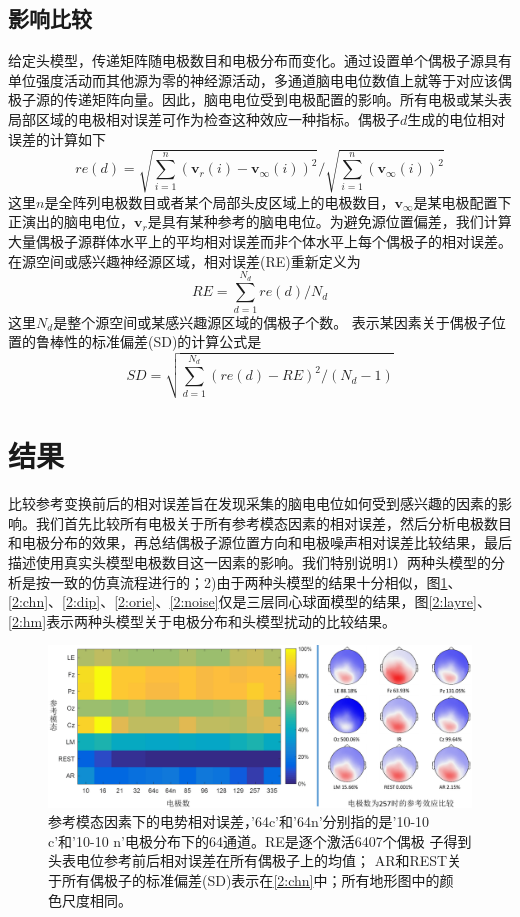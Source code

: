 \subsection{影响比较}
给定头模型，传递矩阵随电极数目和电极分布而变化。通过设置单个偶极子源具有单位强度活动而其他源为零的神经源活动，多通道脑电电位数值上就等于对应该偶极子源的传递矩阵向量。因此，脑电电位受到电极配置的影响。所有电极或某头表局部区域的电极相对误差可作为检查这种效应一种指标。偶极子$d$生成的电位相对误差的计算如下
\begin{equation*}
re(d)=\sqrt{\sum_{i=1}^n(\mathbf{v}_r(i)-\mathbf{v}_{\infty}(i))^2}/\sqrt{\sum_{i=1}^n(\mathbf{v}_{\infty}(i))^2}
\end{equation*}
这里$n$是全阵列电极数目或者某个局部头皮区域上的电极数目，$\mathbf{v}_{\infty}$是某电极配置下正演出的脑电电位，$\mathbf{v}_r$是具有某种参考的脑电电位。为避免源位置偏差，我们计算大量偶极子源群体水平上的平均相对误差而非个体水平上每个偶极子的相对误差。在源空间或感兴趣神经源区域，相对误差(RE)重新定义为
\begin{equation*}
RE=\sum_{d=1}^{N_d}re(d)/{N_d}
\end{equation*}
这里$N_d$是整个源空间或某感兴趣源区域的偶极子个数。 表示某因素关于偶极子位置的鲁棒性的标准偏差(SD)的计算公式是
\begin{equation*}
SD=\sqrt{\sum_{d=1}^{N_d}(re(d)-RE)^2/(N_d-1)}
\end{equation*}

\section{结果}
比较参考变换前后的相对误差旨在发现采集的脑电电位如何受到感兴趣的因素的影响。我们首先比较所有电极关于所有参考模态因素的相对误差，然后分析电极数目和电极分布的效果，再总结偶极子源位置方向和电极噪声相对误差比较结果，最后描述使用真实头模型电极数目这一因素的影响。我们特别说明1）两种头模型的分析是按一致的仿真流程进行的；2)由于两种头模型的结果十分相似，图\ref{2:re}、\ref{2:chn}、\ref{2:dip}、\ref{2:orie}、\ref{2:noise}仅是三层同心球面模型的结果，图\ref{2:layre}、\ref{2:hm}表示两种头模型关于电极分布和头模型扰动的比较结果。
\begin{figure}[h!]
	\centering
	\includegraphics[width=15cm]{pic/JNE/figure3.png}
	\caption{参考模态因素下的电势相对误差，'64c'和'64n'分别指的是'10-10 c'和'10-10 n'电极分布下的64通道。RE是逐个激活6407个偶极
	子得到头表电位参考前后相对误差在所有偶极子上的均值； AR和REST关于所有偶极子的标准偏差(SD)表示在\ref{2:chn}中；所有地形图中的颜
	色尺度相同。}
	\label{2:re}
\end{figure}
